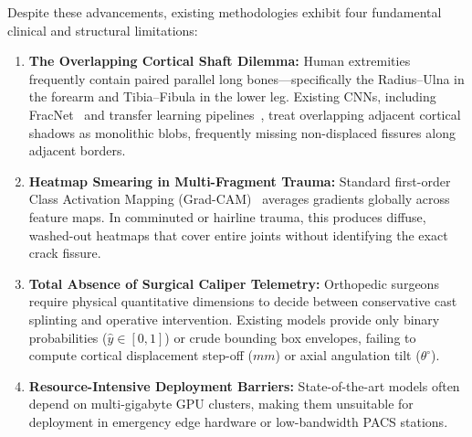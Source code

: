\documentclass[3p,twocolumn]{elsarticle}
\begin{document}
Despite these advancements, existing methodologies exhibit four fundamental clinical and structural limitations:
\begin{enumerate}
    \item \textbf{The Overlapping Cortical Shaft Dilemma:} Human extremities frequently contain paired parallel long bones---specifically the Radius--Ulna in the forearm and Tibia--Fibula in the lower leg. Existing CNNs, including FracNet~\cite{fracnet2025} and transfer learning pipelines~\cite{noveltransfer2025}, treat overlapping adjacent cortical shadows as monolithic blobs, frequently missing non-displaced fissures along adjacent borders.
    \item \textbf{Heatmap Smearing in Multi-Fragment Trauma:} Standard first-order Class Activation Mapping (Grad-CAM)~\cite{selvaraju2017grad} averages gradients globally across feature maps. In comminuted or hairline trauma, this produces diffuse, washed-out heatmaps that cover entire joints without identifying the exact crack fissure.
    \item \textbf{Total Absence of Surgical Caliper Telemetry:} Orthopedic surgeons require physical quantitative dimensions to decide between conservative cast splinting and operative intervention. Existing models provide only binary probabilities ($\hat{y} \in [0, 1]$) or crude bounding box envelopes, failing to compute cortical displacement step-off ($mm$) or axial angulation tilt ($\theta^\circ$).
    \item \textbf{Resource-Intensive Deployment Barriers:} State-of-the-art models often depend on multi-gigabyte GPU clusters, making them unsuitable for deployment in emergency edge hardware or low-bandwidth PACS stations.
\end{enumerate}
\end{document}
